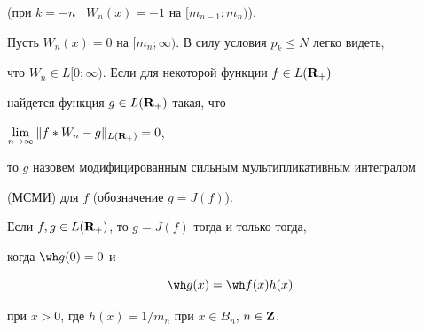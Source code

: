(при $k=-n$ \ $W_n(x)=-1$ на $[m_{n-1};m_n)$). 


Пусть $W_n(x)=0$ на $[m_n;\infty)$. В силу условия $p_k\leq N$ легко видеть,


что $W_n\in L[0;\infty)$. Если для некоторой функции $f\in L({\bold R}_+)$ 


найдется функция $g\in L({\bold R}_+)$ такая, что 


${\lim \limits_{n\to\infty}\|f*W_n - g\|_{L({\bold R}_+)}=0}$, 


то $g$ назовем модифицированным сильным мультипликативным интегралом 


(МСМИ) для $f$ (обозначение $g=J(f)$).








\begin{thms}


Если $f,g\in L({\bold R}_+)$, то $g=J(f)$ тогда и только тогда,


когда ${\wh g}(0)=0$ и


\begin{equation}


{\wh g}(x)={\wh f}(x)h(x)


\end{equation}


при $x>0$, где $h(x)=1/m_n$ при $x\in B_n$, $n\in {\bold Z}$.


\end{thms}








